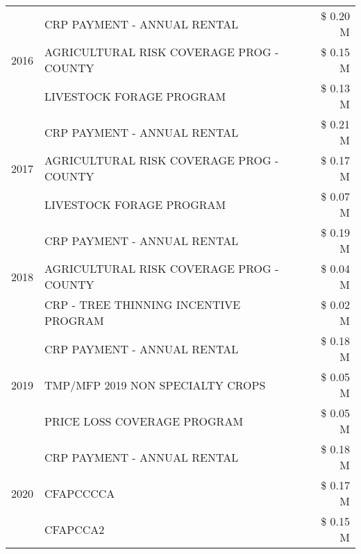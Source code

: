 \begin{tabular}{llr}
\cline{1-3}
\multirow[t]{3}{*}{2016} & CRP PAYMENT - ANNUAL RENTAL & \$ 0.20 M \\
 & AGRICULTURAL RISK COVERAGE PROG - COUNTY & \$ 0.15 M \\
 & LIVESTOCK FORAGE PROGRAM & \$ 0.13 M \\
\cline{1-3}
\multirow[t]{3}{*}{2017} & CRP PAYMENT - ANNUAL RENTAL & \$ 0.21 M \\
 & AGRICULTURAL RISK COVERAGE PROG - COUNTY & \$ 0.17 M \\
 & LIVESTOCK FORAGE PROGRAM & \$ 0.07 M \\
\cline{1-3}
\multirow[t]{3}{*}{2018} & CRP PAYMENT - ANNUAL RENTAL & \$ 0.19 M \\
 & AGRICULTURAL RISK COVERAGE PROG - COUNTY & \$ 0.04 M \\
 & CRP - TREE THINNING INCENTIVE PROGRAM & \$ 0.02 M \\
\cline{1-3}
\multirow[t]{3}{*}{2019} & CRP PAYMENT - ANNUAL RENTAL & \$ 0.18 M \\
 & TMP/MFP 2019 NON SPECIALTY CROPS & \$ 0.05 M \\
 & PRICE LOSS COVERAGE PROGRAM & \$ 0.05 M \\
\cline{1-3}
\multirow[t]{3}{*}{2020} & CRP PAYMENT - ANNUAL RENTAL & \$ 0.18 M \\
 & CFAPCCCCA & \$ 0.17 M \\
 & CFAPCCA2 & \$ 0.15 M \\
\cline{1-3}
\bottomrule
\end{tabular}
